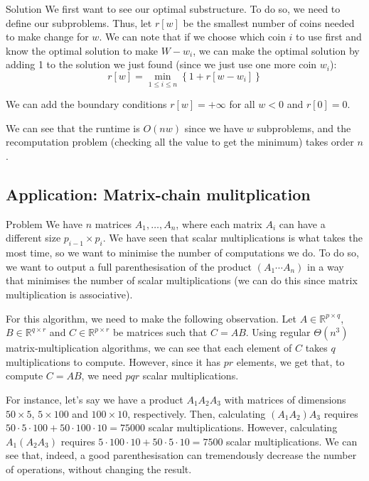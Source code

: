 \documentclass[a4paper]{article}
\begin{document}
\begin{parag}{Solution}
    We first want to see our optimal substructure. To do so, we need to define our subproblems. Thus, let $r\left[w\right]$ be the smallest number of coins needed to make change for $w$. We can note that if we choose which coin $i$ to use first and know the optimal solution to make $W - w_i$, we can make the optimal solution by adding 1 to the solution we just found (since we just use one more coin $w_i$):
    \[r\left[w\right] = \min_{1 \leq i \leq n} \left\{1 + r\left[w - w_i\right]\right\}\]
    
    We can add the boundary conditions $r\left[w\right] = +\infty$ for all $w < 0$ and $r\left[0\right] = 0$. 

    We can see that the runtime is $O\left(nw\right)$ since we have $w$ subproblems, and the recomputation problem (checking all the value to get the minimum) takes order $n$.
\end{parag}


\subsection{Application: Matrix-chain mulitplication}

\begin{parag}{Problem}
    We have $n$ matrices $A_1, \ldots, A_n$, where each matrix $A_i$ can have a different size $p_{i-1} \times p_i$. We have seen that scalar multiplications is what takes the most time, so we want to minimise the number of computations we do. To do so, we want to output a full parenthesisation of the product $\left(A_1 \cdots A_n\right)$ in a way that minimises the number of scalar multiplications (we can do this since matrix multiplication is associative). 

    For this algorithm, we need to make the following observation. Let $A \in \mathbb{R}^{p \times q}$, $B \in \mathbb{R}^{q \times r}$ and $C \in \mathbb{R}^{p \times r}$ be matrices such that $C = AB$. Using regular $\Theta\left(n^3\right)$ matrix-multiplication algorithms, we can see that each element of $C$ takes $q$ multiplications to compute. However, since it has $pr$ elements, we get that, to compute $C = AB$, we need $pqr$ scalar multiplications.

    For instance, let's say we have a product $A_1 A_2 A_3$ with matrices of dimensions $50 \times 5$, $5 \times 100$ and $100 \times 10$, respectively. Then, calculating $\left(A_1 A_2\right) A_3$ requires $50 \cdot  5 \cdot  100 + 50 \cdot  100 \cdot  10 = 75000$ scalar multiplications. However, calculating $A_1 \left(A_2 A_3\right)$ requires $5 \cdot  100 \cdot  10 + 50 \cdot  5 \cdot 10 = 7500$ scalar multiplications. We can see that, indeed, a good parenthesisation can tremendously decrease the number of operations, without changing the result.
\end{parag}
\end{document}
